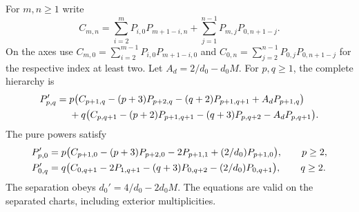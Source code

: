 \begin{proposition}\label{split:prop}
For \(m,n\geq1\) write
\begin{equation}
 C_{m,n}=\sum_{i=2}^{m}P_{i,0}P_{m+1-i,n}
            +\sum_{j=1}^{n-1}P_{m,j}P_{0,n+1-j}.
 \label{split:convolution}
\end{equation}
On the axes use \(C_{m,0}=\sum_{i=2}^{m-1}P_{i,0}P_{m+1-i,0}\)
and \(C_{0,n}=\sum_{j=2}^{n-1}P_{0,j}P_{0,n+1-j}\) for the
respective index at least two. Let \(A_d=2/d_0-d_0M\).
For \(p,q\geq1\), the complete hierarchy \cite{BakerCM08} is
\begin{align}
 P_{p,q}'={}&p\bigl(C_{p+1,q}-(p+3)P_{p+2,q}-(q+2)P_{p+1,q+1}
                                  +A_dP_{p+1,q}\bigr)\notag\\
   &+q\bigl(C_{p,q+1}-(p+2)P_{p+1,q+1}-(q+3)P_{p,q+2}
                                  -A_dP_{p,q+1}\bigr).
 \label{split:mixed}
\end{align}
The pure powers satisfy
\begin{align}
 P_{p,0}'&=p\bigl(C_{p+1,0}-(p+3)P_{p+2,0}-2P_{p+1,1}
                                   +(2/d_0)P_{p+1,0}\bigr),
       \qquad p\geq2,\notag\\
 P_{0,q}'&=q\bigl(C_{0,q+1}-2P_{1,q+1}-(q+3)P_{0,q+2}
                                   -(2/d_0)P_{0,q+1}\bigr),
       \qquad q\geq2 .
 \label{split:axes}
\end{align}
The separation obeys \(d_0'=4/d_0-2d_0M\). The equations
are valid on the separated charts, including exterior multiplicities.
\end{proposition}

